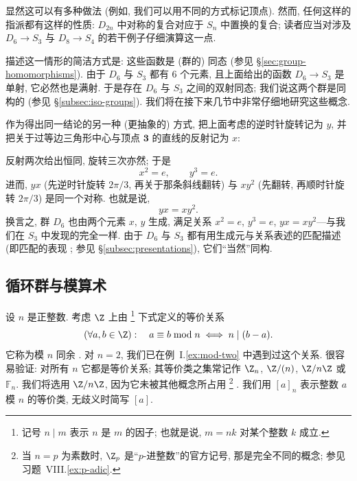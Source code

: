显然这可以有多种做法 (例如, 我们可以用不同的方式标记顶点). 然而, 任何这样的指派都有这样的性质: $D_{2n}$ 中对称的复合对应于 $S_n$ 中置换的复合; 读者应当对涉及 $D_6 \rightarrow S_3$ 与 $D_8 \rightarrow S_4$ 的若干例子仔细演算这一点.

描述这一情形的简洁方式是: 这些函数是 (群的) 同态 (参见 \S\ref{sec:group-homomorphisms}). 由于 $D_6$ 与 $S_3$ 都有 $6$ 个元素, 且上面给出的函数 $D_6 \rightarrow S_3$ 是单射, 它必然也是满射. 于是存在 $D_6$ 与 $S_3$ 之间的双射同态; 我们说这两个群是同构的 (参见 \S\ref{subsec:iso-groups}). 我们将在接下来几节中非常仔细地研究这些概念.

作为得出同一结论的另一种 (更抽象的) 方式, 把上面考虑的逆时针旋转记为 $y$, 并把关于过等边三角形中心与顶点 $\mathbf{3}$ 的直线的反射记为 $x$:
\begin{center}
\end{center}
反射两次给出恒同, 旋转三次亦然; 于是
\[
x^2 = e, \qquad y^3 = e.
\]
进而, $yx$ (先逆时针旋转 $2\pi/3$, 再关于那条斜线翻转) 与 $xy^2$ (先翻转, 再顺时针旋转 $2\pi/3$) 是同一个对称. 也就是说,
\[
yx = xy^2.
\]
换言之, 群 $D_6$ 也由两个元素 $x$, $y$ 生成, 满足关系 $x^2 = e$, $y^3 = e$, $yx = xy^2$---与我们在 $S_3$ 中发现的完全一样. 由于 $D_6$ 与 $S_3$ 都有用生成元与关系表述的匹配描述 (即匹配的表现%
; 参见 \S\ref{subsec:presentations}), 它们``当然''同构.

\subsection{循环群与模算术}
\label{subsec:cyclic-groups}

设 $n$ 是正整数. 考虑 $\Z$ 上由%
\footnote{记号 $n \mid m$ 表示 $n$ 是 $m$ 的因子; 也就是说, $m = nk$ 对某个整数 $k$ 成立.}%
下式定义的等价关系
\[
(\forall a, b \in \Z): \quad a \equiv b \bmod n \iff n \mid (b - a).
\]
它称为模 $n$ 同余%
. 对 $n = 2$, 我们已在例~I.\ref{ex:mod-two} 中遇到过这个关系. 很容易验证: 对所有 $n$ 它都是等价关系; 其等价类之集常记作 $\Z_n$, $\Z/(n)$, $\Z/n\Z$ 或 $\mathbb{F}_n$. 我们将选用 $\Z/n\Z$, 因为它未被其他概念所占用%
\footnote{当 $n = p$ 为素数时, $\Z_p$ 是``$p$-进整数''的官方记号, 那是完全不同的概念; 参见习题~VIII.\ref{ex:p-adic}.}%
. 我们用 $[a]_n$ 表示整数 $a$ 模 $n$ 的等价类, 无歧义时简写 $[a]$.

